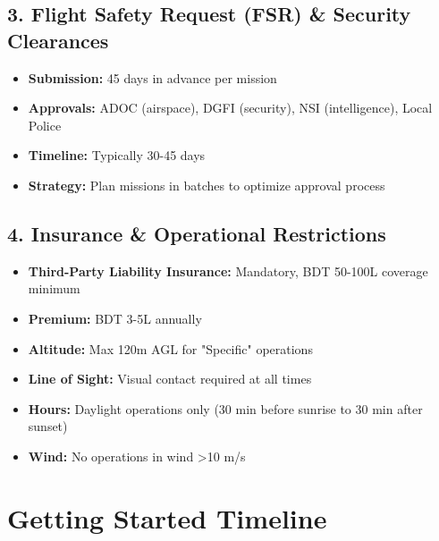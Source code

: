 \subsection{3. Flight Safety Request (FSR) \& Security Clearances}

\begin{itemize}
    \item \textbf{Submission:} 45 days in advance per mission
    \item \textbf{Approvals:} ADOC (airspace), DGFI (security), NSI (intelligence), Local Police
    \item \textbf{Timeline:} Typically 30-45 days
    \item \textbf{Strategy:} Plan missions in batches to optimize approval process
\end{itemize}

\subsection{4. Insurance \& Operational Restrictions}

\begin{itemize}
    \item \textbf{Third-Party Liability Insurance:} Mandatory, BDT 50-100L coverage minimum
    \item \textbf{Premium:} BDT 3-5L annually
    \item \textbf{Altitude:} Max 120m AGL for "Specific" operations
    \item \textbf{Line of Sight:} Visual contact required at all times
    \item \textbf{Hours:} Daylight operations only (30 min before sunrise to 30 min after sunset)
    \item \textbf{Wind:} No operations in wind >10 m/s
\end{itemize}

\section{Getting Started Timeline}

